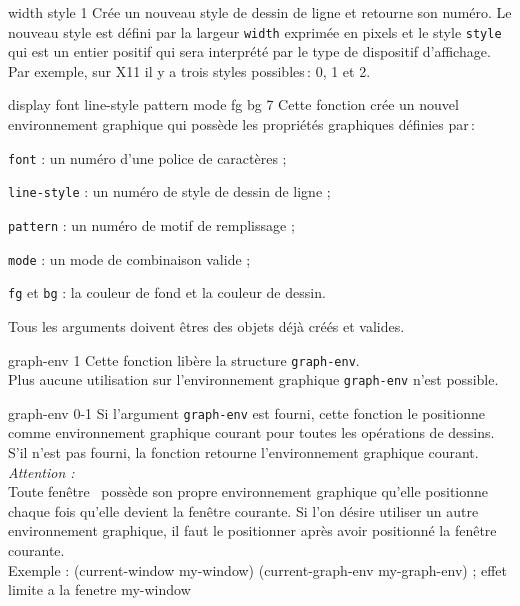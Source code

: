  {width style} {1}
Cr\'{e}e un nouveau style de dessin de ligne et retourne son num\'{e}ro.
Le nouveau style est d\'{e}fini par la largeur {\tt width} exprim\'{e}e en pixels
et le style {\tt  style} qui est un entier positif qui sera interpr\'{e}t\'{e}
par le type de dispositif d'affichage.\\
Par exemple, sur X11 il y a trois styles possibles\,: 0, 1 et 2.


\BeginHide

 {display font line-style pattern mode fg bg} {7}
Cette fonction cr\'{e}e un nouvel environnement graphique qui poss\`{e}de les
propri\'{e}t\'{e}s graphiques d\'{e}finies par\,:\\
\begin {Itemize}
\item {\tt font} : un num\'{e}ro d'une police de caract\`{e}res ;
\item {\tt line-style} : un num\'{e}ro de style de dessin de ligne ;
\item {\tt pattern} : un num\'{e}ro de motif de remplissage ;
\item {\tt mode} : un mode de combinaison valide ;
\item {\tt fg} et {\tt bg} : la couleur de fond et la couleur de dessin.
\end{Itemize}
Tous les arguments doivent \^{e}tres des objets d\'{e}j\`{a} cr\'{e}\'{e}s et valides.


 {graph-env} {1}
Cette fonction lib\`{e}re  la structure {\tt graph-env}.\\
Plus aucune utilisation sur l'environnement graphique {\tt graph-env} n'est
possible.


 {graph-env} {0-1}
Si l'argument {\tt graph-env}  est fourni, cette fonction le positionne
comme environnement graphique courant pour toutes les op\'{e}rations de dessins.\\
S'il n'est pas fourni, la fonction retourne l'environnement  graphique
courant.\\
{\em Attention :} \\
Toute fen\^{e}tre \LeLisp\ poss\`{e}de son propre environnement graphique qu'elle
positionne chaque fois qu'elle devient la fen\^{e}tre courante.
Si l'on d\'{e}sire utiliser un autre environnement graphique, il faut le
positionner apr\`{e}s avoir positionn\'{e} la fen\^{e}tre courante.\\
Exemple :
\BeginLL
(current-window my-window)
(current-graph-env my-graph-env) ; effet limite a la fenetre my-window
\EndLL


